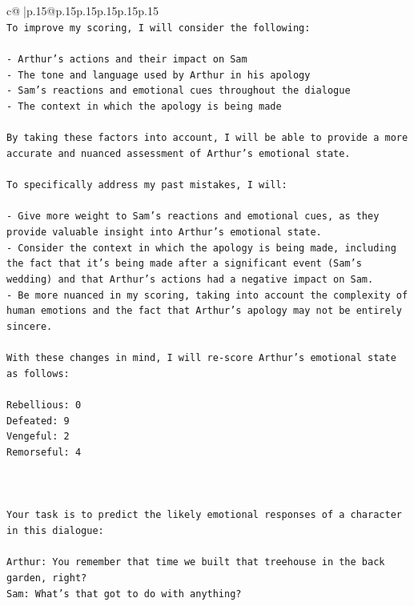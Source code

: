 \documentclass{article}
\begin{document}
{\begin{supertabular}{c@{$\;$}|p{.15\linewidth}@{}p{.15\linewidth}p{.15\linewidth}p{.15\linewidth}p{.15\linewidth}p{.15\linewidth}}
{{{\\ 
\texttt{To improve my scoring, I will consider the following:} \\
\\ 
\texttt{{-} Arthur's actions and their impact on Sam} \\
\texttt{{-} The tone and language used by Arthur in his apology} \\
\texttt{{-} Sam's reactions and emotional cues throughout the dialogue} \\
\texttt{{-} The context in which the apology is being made} \\
\\ 
\texttt{By taking these factors into account, I will be able to provide a more accurate and nuanced assessment of Arthur's emotional state.} \\
\\ 
\texttt{To specifically address my past mistakes, I will:} \\
\\ 
\texttt{{-} Give more weight to Sam's reactions and emotional cues, as they provide valuable insight into Arthur's emotional state.} \\
\texttt{{-} Consider the context in which the apology is being made, including the fact that it's being made after a significant event (Sam's wedding) and that Arthur's actions had a negative impact on Sam.} \\
\texttt{{-} Be more nuanced in my scoring, taking into account the complexity of human emotions and the fact that Arthur's apology may not be entirely sincere.} \\
\\ 
\texttt{With these changes in mind, I will re{-}score Arthur's emotional state as follows:} \\
\\ 
\texttt{Rebellious: 0} \\
\texttt{Defeated: 9} \\
\texttt{Vengeful: 2} \\
\texttt{Remorseful: 4} \\
\\ 
\\ 
\\ 
\texttt{Your task is to predict the likely emotional responses of a character in this dialogue:} \\
\\ 
\texttt{Arthur: You remember that time we built that treehouse in the back garden, right?} \\
\texttt{Sam: What's that got to do with anything?} \\
}}}
\end{supertabular}}
\end{document}
